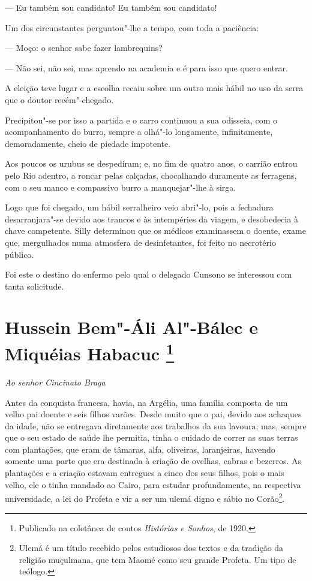 --- Eu também sou candidato! Eu também sou candidato!

Um dos circunstantes perguntou"-lhe a tempo, com toda a paciência:

--- Moço: o senhor sabe fazer lambrequins?

--- Não sei, não sei, mas aprendo na academia e é para isso que quero
entrar.

A eleição teve lugar e a escolha recaiu sobre um outro mais hábil no uso
da serra que o doutor recém"-chegado.

Precipitou"-se por isso a partida e o carro continuou a sua odisseia, com
o acompanhamento do burro, sempre a olhá"-lo longamente, infinitamente,
demoradamente, cheio de piedade impotente.

Aos poucos os urubus se despediram; e, no fim de quatro anos, o carrião
entrou pelo Rio adentro, a roncar pelas calçadas, chocalhando duramente
as ferragens, com o seu manco e compassivo burro a manquejar"-lhe à
sirga.

Logo que foi chegado, um hábil serralheiro veio abri"-lo, pois a
fechadura desarranjara"-se devido aos trancos e às intempéries da viagem,
e desobedecia à chave competente. Silly determinou que os médicos
examinassem o doente, exame que, mergulhados numa atmosfera de
desinfetantes, foi feito no necrotério público.

Foi este o destino do enfermo pelo qual o delegado Cunsono se interessou
com tanta solicitude.


\chapter[Hussein Bem"-Áli Al"-Bálec e Miquéias Habacuc]{Hussein Bem"-Áli Al"-Bálec e Miquéias Habacuc \footnote[*]{Publicado na coletânea de contos \emph{Histórias e Sonhos}, de 1920.}}


\hfill\emph{Ao senhor Cincinato Braga}\bigskip

\noindent{}Antes da conquista francesa, havia, na Argélia, uma família composta de
um velho pai doente e seis filhos varões. Desde muito que o pai, devido
aos achaques da idade, não se entregava diretamente aos trabalhos da sua
lavoura; mas, sempre que o seu estado de saúde lhe permitia, tinha o
cuidado de correr as suas terras com plantações, que eram de tâmaras,
alfa, oliveiras, laranjeiras, havendo somente uma parte que era
destinada à criação de ovelhas, cabras e bezerros. As plantações e a
criação estavam entregues a cinco dos seus filhos, pois o mais velho,
ele o tinha mandado ao Cairo, para estudar profundamente, na respectiva
universidade, a lei do Profeta e vir a ser um ulemá digno e sábio no
Corão\footnote{Ulemá é um título recebido pelos estudiosos dos textos e
  da tradição da religião muçulmana, que tem Maomé como seu grande
  Profeta. Um tipo de teólogo.}.


